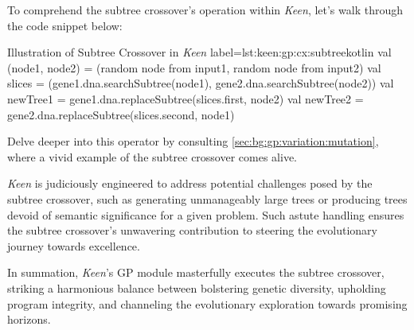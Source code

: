   To comprehend the subtree crossover's operation within \textit{Keen}, let's 
  walk through the code snippet below:

    \begin{code}{
      Illustration of Subtree Crossover in \textit{Keen}
    }{label=lst:keen:gp:cx:subtree}{kotlin}
      val (node1, node2) = (random node from input1, random node from input2)
      val slices = (gene1.dna.searchSubtree(node1), gene2.dna.searchSubtree(node2))
      val newTree1 = gene1.dna.replaceSubtree(slices.first, node2)
      val newTree2 = gene2.dna.replaceSubtree(slices.second, node1)
    \end{code}

  Delve deeper into this operator by consulting
  \vref{sec:bg:gp:variation:mutation}, where a vivid example of the subtree 
  crossover comes alive.

  \textit{Keen} is judiciously engineered to address potential challenges posed 
  by the subtree crossover, such as generating unmanageably large trees or 
  producing trees devoid of semantic significance for a given problem. Such 
  astute handling ensures the subtree crossover's unwavering contribution to 
  steering the evolutionary journey towards excellence.

  In summation, \textit{Keen}'s GP module masterfully executes the subtree 
  crossover, striking a harmonious balance between bolstering genetic 
  diversity, upholding program integrity, and channeling the evolutionary 
  exploration towards promising horizons.
